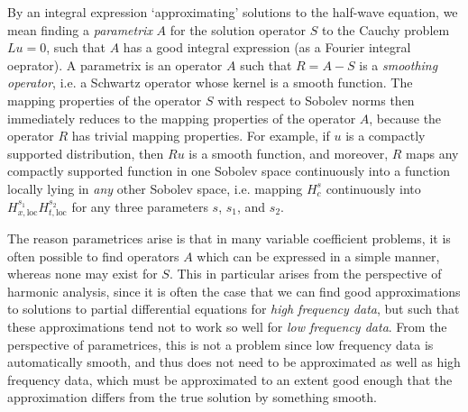\documentclass{article}
\theoremstyle{plain}
\theoremstyle{remark}
\theoremstyle{definition}
\DeclareMathOperator{\RR}{\mathbb{R}}
\begin{document}
\begin{comment}
For such an operator, we can find a countable, orthogonal basis $\{ e_\lambda : \lambda \geq 0 \}$ of $L^2(M)$, such that $Pe_\lambda = \lambda e_\lambda$, and such that for each $\lambda$, $e_\lambda$ is a smooth function, with $L^2_s$ norm $O_s(\lambda^s)$. The number of elements of this basis with eigenvalue at most $\lambda$ is $O(1 + \lambda^d)$. Given this basis, we can define a family of bounded operators $\{ e^{2 \pi itP} \}$ on $L^2(M)$ by setting $e^{2 \pi it P} e_\lambda = e^{2 \pi it \lambda} e_\lambda$, and then consider a solution operator
%
\[ (Wf)(x,t) = (e^{2 \pi it \lambda} f)(x). \]
%
Using the $L^2_s$ norm properties of the eigenfunctions $\{ e_\lambda \}$, and the fact that for any $f \in C^\infty(M)$,
%
\[ \langle f, e_\lambda \rangle \lesssim_N \lambda^{-N} \quad\text{for all $N > 0$,} \]
%
it is simple to check that $W$ maps $C^\infty(M)$ into $C^\infty_{\text{loc}}(M \times \RR)$, and that for $f \in C^\infty(M)$, the smooth function $u = Wf$ solves the equation $Lu = 0$ with initial conditions $f$. One can also prove the uniqueness of solution solutions, e.g. using energy estimates, but this takes us a little far afield of what we want to talk about in these notes.
\end{comment}

By an integral expression `approximating' solutions to the half-wave equation, we mean finding a \emph{parametrix} $A$ for the solution operator $S$ to the Cauchy problem $Lu = 0$, such that $A$ has a good integral expression (as a Fourier integral oeprator). A parametrix is an operator $A$ such that $R = A - S$ is a \emph{smoothing operator}, i.e. a Schwartz operator whose kernel is a smooth function. The mapping properties of the operator $S$ with respect to Sobolev norms then immediately reduces to the mapping properties of the operator $A$, because the operator $R$ has trivial mapping properties. For example, if $u$ is a compactly supported distribution, then $Ru$ is a smooth function, and moreover, $R$ maps any compactly supported function in one Sobolev space continuously into a function locally lying in \emph{any} other Sobolev space, i.e. mapping $H^s_c$ continuously into $H^{s_1}_{x,\text{loc}} H^{s_2}_{t,\text{loc}}$ for any three parameters $s$, $s_1$, and $s_2$.

The reason parametrices arise is that in many variable coefficient problems, it is often possible to find operators $A$ which can be expressed in a simple manner, whereas none may exist for $S$. This in particular arises from the perspective of harmonic analysis, since it is often the case that we can find good approximations to solutions to partial differential equations for \emph{high frequency data}, but such that these approximations tend not to work so well for \emph{low frequency data}. From the perspective of parametrices, this is not a problem since low frequency data is automatically smooth, and thus does not need to be approximated as well as high frequency data, which must be approximated to an extent good enough that the approximation differs from the true solution by something smooth.
\end{document}
